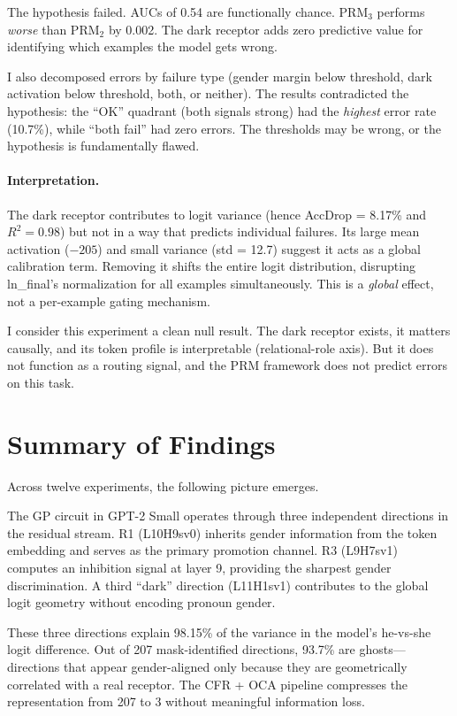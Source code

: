 \documentclass[11pt,a4paper]{article}
\begin{document}
The hypothesis failed. AUCs of 0.54 are functionally chance. PRM$_3$ performs \emph{worse} than PRM$_2$ by 0.002. The dark receptor adds zero predictive value for identifying which examples the model gets wrong.

I also decomposed errors by failure type (gender margin below threshold, dark activation below threshold, both, or neither). The results contradicted the hypothesis: the ``OK'' quadrant (both signals strong) had the \emph{highest} error rate (10.7\%), while ``both fail'' had zero errors. The thresholds may be wrong, or the hypothesis is fundamentally flawed.

\paragraph{Interpretation.} The dark receptor contributes to logit variance (hence AccDrop = 8.17\% and $R^2 = 0.98$) but not in a way that predicts individual failures. Its large mean activation ($-205$) and small variance (std = 12.7) suggest it acts as a global calibration term. Removing it shifts the entire logit distribution, disrupting ln\_final's normalization for all examples simultaneously. This is a \emph{global} effect, not a per-example gating mechanism.

I consider this experiment a clean null result. The dark receptor exists, it matters causally, and its token profile is interpretable (relational-role axis). But it does not function as a routing signal, and the PRM framework does not predict errors on this task.


\section{Summary of Findings}
\label{sec:summary}

Across twelve experiments, the following picture emerges.

The GP circuit in GPT-2 Small operates through three independent directions in the residual stream. R1 (L10H9sv0) inherits gender information from the token embedding and serves as the primary promotion channel. R3 (L9H7sv1) computes an inhibition signal at layer 9, providing the sharpest gender discrimination. A third ``dark'' direction (L11H1sv1) contributes to the global logit geometry without encoding pronoun gender.

These three directions explain 98.15\% of the variance in the model's he-vs-she logit difference. Out of 207 mask-identified directions, 93.7\% are ghosts---directions that appear gender-aligned only because they are geometrically correlated with a real receptor. The CFR + OCA pipeline compresses the representation from 207 to 3 without meaningful information loss.
\end{document}
